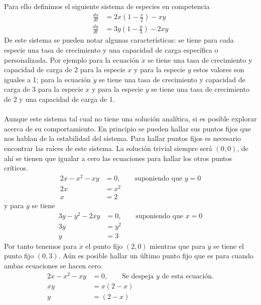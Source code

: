 \begin{ejemplo}\label{eg:2x2}
	Para ello definimos el siguiente sistema de especies en competencia
	\begin{equation}\label{eqn:Sist2x2Comp}
		\begin{split}
			\frac{dx}{dt}&=2x\left(1-\frac{x}{2}\right)-xy\\
			\frac{dy}{dt}&=3y\left(1-\frac{y}{3}\right)-2xy
		\end{split}
	\end{equation}
	De este sistema se pueden notar algunas características: se tiene para cada especie una tasa de crecimiento y una capacidad de carga específica o personalizada. Por ejemplo para la ecuación $\dot{x}$ se tiene una tasa de crecimiento y capacidad de carga de 2 para la especie $x$ y para la especie $y$ estos valores son iguales a 1; para la ecuación $\dot{y}$ se tiene una tasa de crecimiento y capacidad de carga de 3 para la especie $x$ y para la especie $y$ se tiene una tasa de crecimiento de 2 y una capacidad de carga de 1. \\
	\\
	Aunque este sistema tal cual no tiene una solución analítica, si es posible explorar acerca de su comportamiento. En principio se pueden hallar sus puntos fijos que nos hablan de la estabilidad del sistema. Para hallar puntos fijos es necesario encontrar las raíces de este sistema. La solución trivial siempre será $(0,0)$, de ahí se tienen que igualar a cero las ecuaciones para hallar los otros puntos críticos.
	\begin{align*}
		2x-x^2-xy &= 0,\qquad\text{suponiendo que $y = 0$}\\
		2x &= x^2\\
		x&=2
	\end{align*}
	y para $\dot{y}$ se tiene
	\begin{align*}
		3y-y^2-2xy&=0,\qquad\text{suponiendo que $x=0$}\\
		3y &= y^2\\
		y &= 3
	\end{align*}
	Por tanto tenemos para $\dot{x}$ el punto fijo $(2,0)$ mientras que para $\dot{y}$ se tiene el punto fijo $(0,3)$. Aún es posible hallar un último punto fijo que es para cuando ambas ecuaciones se hacen cero.
	\begin{align*}
		2x-x^2-xy&=0,\qquad\text{Se despeja $y$ de esta ecuación.}\\
		xy &= x(2-x)\\
		y &= (2-x)\\

\end{align*}
\end{ejemplo}
